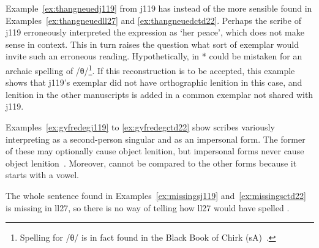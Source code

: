 \begin{mwl}
\end{mwl}
Example~\ref{ex:thangneuedj119} from \gls{j119} has  instead of the more sensible  found in Examples~\ref{ex:thangneuedll27} and \ref{ex:thangneuedctd22}. Perhaps the scribe of \gls{j119} erroneously interpreted the expression as `her peace', which does not make sense in context. This in turn raises the question what sort of exemplar would invite such an erroneous reading. Hypothetically,  in * could be mistaken for an archaic spelling of /θ/\footnote{Spelling  for /θ/ is in fact found in the Black Book of Chirk (\gls{sA})~\autocite[147]{Rus_Scribal95}.}. If this reconstruction is to be accepted, this example shows that \gls{j119}'s exemplar did not have orthographic lenition in this case, and lenition in the other manuscripts is added in a common exemplar not shared with \gls{j119}.
\begin{mwl}
\end{mwl}
Examples~\ref{ex:gyfredegj119} to \ref{ex:gyfredegctd22} show scribes variously interpreting  as a second-person singular and as an impersonal form. The former of these may optionally cause object lenition, but impersonal forms never cause object lenition~\autocite[§~21]{evans_grammar_1964}. Moreover,  cannot be compared to the other forms because it starts with a vowel.

\begin{mwl}
\end{mwl}
The whole sentence found in Examples~\ref{ex:missingsj119} and~\ref{ex:missingsctd22} is missing in \gls{ll27}, so there is no way of telling how \gls{ll27} would have spelled .

